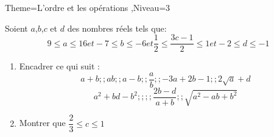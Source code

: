 \documentclass[a4paper,12pt]{article}
\begin{document}
\begin{Maquette}[Fiche]{Theme=L'ordre et les opérations ,Niveau=3}
\begin{exercice}
Soient $a$,$b$,$c$ et $d$ des nombres réels tels que: 
$$9\leq a\leq 16 et -7\leq b\leq -6 et \dfrac{1}{2}\leq \dfrac{3c-1}{2}\leq 1 et -2\leq d \leq -1 $$
\begin{enumerate}
\item Encadrer ce qui suit :
$$a+b ;; ab ;; a-b ;; \dfrac{a}{b} ;; -3a+2b-1 ;; 2\sqrt{a}+d $$
$$a^{2}+bd-b^{2};;;; \dfrac{2b-d}{a+b};;\sqrt{a^{2}-ab+b^{2}} $$
\item Montrer que $\dfrac{2}{3}\leq c \leq 1$
\end{enumerate}
\end{exercice}





\end{Maquette}
\end{document}
